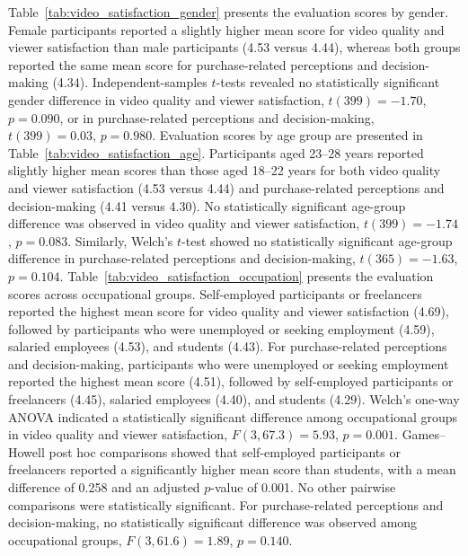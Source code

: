 \documentclass[jtaer,article,submit,moreauthors]{Definitions/mdpi}
\begin{document}
Table~\ref{tab:video_satisfaction_gender} presents the evaluation scores
by gender. Female participants reported a slightly higher mean
score for video quality and viewer satisfaction than male participants
(4.53 versus 4.44), whereas both groups reported the same mean score
for purchase-related perceptions and decision-making (4.34).
Independent-samples \(t\)-tests revealed no statistically significant
gender difference in video quality and viewer satisfaction,
\(t(399)=-1.70\), \(p=0.090\), or in purchase-related perceptions and
decision-making, \(t(399)=0.03\), \(p=0.980\).
Evaluation scores by age group are presented in
Table~\ref{tab:video_satisfaction_age}. Participants aged 23--28 years
reported slightly higher mean scores than those aged 18--22 years for
both video quality and viewer satisfaction (4.53 versus 4.44) and
purchase-related perceptions and decision-making (4.41 versus 4.30).
No statistically significant age-group difference was observed in
video quality and viewer satisfaction,
\(t(399)=-1.74\), \(p=0.083\). Similarly, Welch's \(t\)-test showed no
statistically significant age-group difference in purchase-related
perceptions and decision-making,
\(t(365)=-1.63\), \(p=0.104\).
Table~\ref{tab:video_satisfaction_occupation} presents the evaluation
scores across occupational groups. Self-employed participants or
freelancers reported the highest mean score for video quality and viewer
satisfaction (4.69), followed by participants who were unemployed or
seeking employment (4.59), salaried employees (4.53), and students
(4.43). For purchase-related perceptions and decision-making,
participants who were unemployed or seeking employment reported the
highest mean score (4.51), followed by self-employed participants or
freelancers (4.45), salaried employees (4.40), and students (4.29).
Welch's one-way ANOVA indicated a statistically significant difference
among occupational groups in video quality and viewer satisfaction,
\(F(3,67.3)=5.93\), \(p=0.001\). Games--Howell post hoc comparisons
showed that self-employed participants or freelancers reported a
significantly higher mean score than students, with a mean difference
of 0.258 and an adjusted \(p\)-value of 0.001. No other pairwise
comparisons were statistically significant. For purchase-related
perceptions and decision-making, no statistically significant
difference was observed among occupational groups,
\(F(3,61.6)=1.89\), \(p=0.140\).
\end{document}
